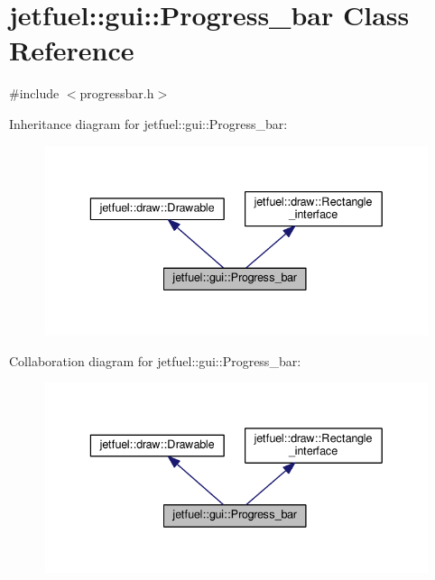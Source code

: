 \hypertarget{classjetfuel_1_1gui_1_1Progress__bar}{}\section{jetfuel\+:\+:gui\+:\+:Progress\+\_\+bar Class Reference}
\label{classjetfuel_1_1gui_1_1Progress__bar}


{\ttfamily \#include $<$progressbar.\+h$>$}



Inheritance diagram for jetfuel\+:\+:gui\+:\+:Progress\+\_\+bar\+:
\nopagebreak
\begin{figure}[H]
\begin{center}
\leavevmode
\includegraphics[width=336pt]{classjetfuel_1_1gui_1_1Progress__bar__inherit__graph}
\end{center}
\end{figure}


Collaboration diagram for jetfuel\+:\+:gui\+:\+:Progress\+\_\+bar\+:
\nopagebreak
\begin{figure}[H]
\begin{center}
\leavevmode
\includegraphics[width=336pt]{classjetfuel_1_1gui_1_1Progress__bar__coll__graph}
\end{center}
\end{figure}
